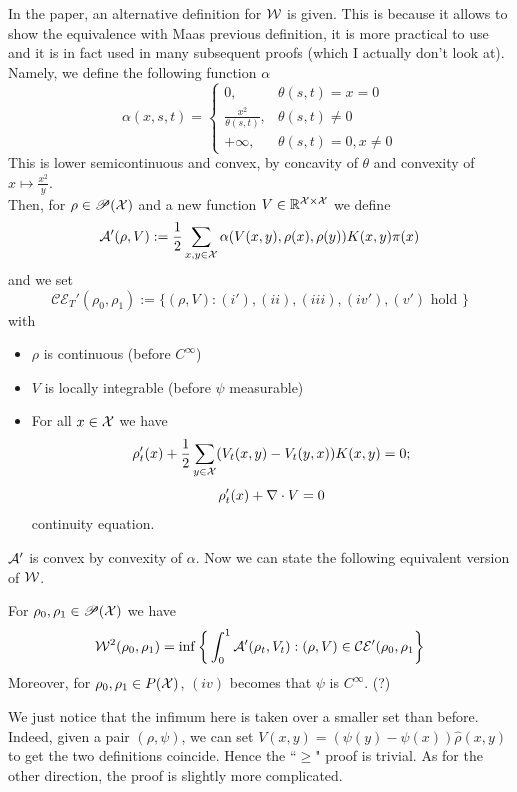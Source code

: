 In the paper, an alternative definition for $\mathcal{W}$ is given. This is because it allows to show the equivalence with Maas previous definition, it is more practical to use and it is in fact used in many subsequent proofs (which I actually don't look at).
\\

Namely, we define the following function $\alpha$
\[
\alpha(x,s,t) =\begin{cases}
    0, &\theta(s,t)=x=0\\
    \frac{x^2}{\theta(s,t)}, & \theta(s,t)\neq0\\
    +\infty, &\theta(s,t)=0, x\neq0
\end{cases}
\]
This is lower semicontinuous and convex, by concavity of $\theta$ and convexity of $x\mapsto\frac{x^2}{y}$.
\\

Then, for $\rho \in \mathscr{P}(\mathcal{X})$ and a new function $V\in\mathbb{R}^{\mathcal{X}\times\mathcal{X}}$ we define 
\[
\mathcal{A}'(\rho,V):=\frac{1}{2}\sum_{x,y\in\mathcal{X}}\alpha(V(x,y),\rho(x),\rho(y))K(x,y)\pi(x)
\]
and we set
\[
\mathcal{CE}_T'(\rho_0,\rho_1):= \{(\rho,V):(i'),(ii),(iii),(iv'),(v') \text{ hold }\}
\]
with
\begin{itemize}
    \item[$(i')$] $\rho$ is continuous (before $C^\infty$)
    \item[$(iv')$] $V$ is locally integrable (before $\psi$ measurable)
    \item[$(v')$] For all $x\in\mathcal{X}$ we have
    \[
    \rho'_t(x)+\frac{1}{2}\sum_{y\in\mathcal{X}}(V_t(x,y)-V_t(y,x))K(x,y)=0;
    \]
    \[
    \rho'_t(x)+\nabla \cdot V=0
    \]
    continuity equation. 
\end{itemize}

$\mathcal{A}'$ is convex by convexity of $\alpha$. Now we can state the following equivalent version of $\mathcal{W}$. 

\begin{lemma}\label{lemma: W}
    For $\rho_0,\rho_1 \in \mathscr{P}(\mathcal{X})$ we have
\[
\mathcal{W}^2(\rho_0,\rho_1)= \inf\bigg\{\int_0^1 \mathcal{A}'(\rho_t,V_t):(\rho,V) \in \mathcal{CE'}(\rho_0,\rho_1\bigg\}
\]
Moreover, for $\rho_0,\rho_1 \in P(\mathcal{X})$, $(iv)$ becomes that $\psi$ is $C^\infty$. (?)
\end{lemma}

We just notice that the infimum here is taken over a smaller set than before. Indeed, given a pair $(\rho,\psi)$, we can set 
$V(x,y)=(\psi(y)-\psi(x))\hat\rho(x,y)$ to get the two definitions coincide. Hence the ``$\ge$" proof is trivial. As for the other direction, the proof is slightly more complicated. 

